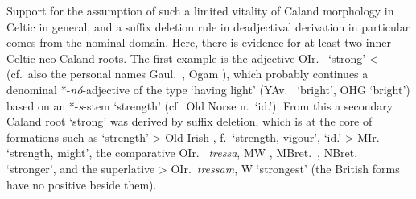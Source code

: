 \documentclass[output=paper,colorlinks,citecolor=brown]{langscibook}
\begin{document}
Support for the assumption of such a limited vitality of Caland morphology  in Celtic in general, and a suffix deletion rule in deadjectival derivation  in particular comes from the nominal domain. Here, there is evidence for at least two inner-Celtic neo-Caland roots. The first example is the adjective OIr.\    ‘strong’ <  (cf.\ also the personal names Gaul.\ , Ogam ), which probably continues a denominal  *-\textit{nó}-adjective of the type  ‘having light’ (YAv.\  ‘bright’, OHG  ‘bright’) based on an *-\textit{s}-stem  ‘strength’ (cf.\ Old Norse  n.\ ‘id.’). From this  a secondary Caland root  ‘strong’ was derived by suffix deletion, which is at the core of formations such as  ‘strength’ > Old Irish , f.\ ‘strength, vigour’,  ‘id.’ > MIr.\  ‘strength, might’, the comparative OIr.\   \textit{tressa}, MW , MBret.\ , NBret.\  ‘stronger’, and the superlative  > OIr.\  \textit{tressam}, W  ‘strongest’ (the British forms have no positive beside them). 
\end{document}
